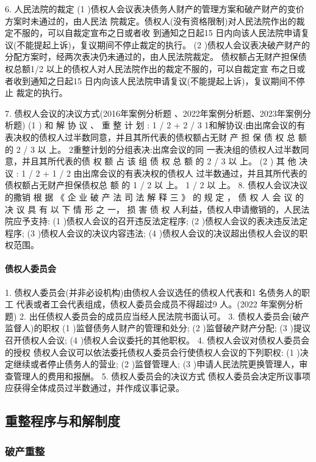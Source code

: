 \documentclass[UTF8,12pt]{ctexart}
\numberwithin{equation}{section} %
\numberwithin{figure}{section}
\numberwithin{table}{section}
\begin{document}
	
	6. 人民法院的裁定
	(1 )债权人会议表决债务人财产的管理方案和破产财产的变价方案时未通过的，由人民法 院裁定。债权人(没有资格限制)对人民法院作出的裁定不服的，可以自裁定宣布之日或者收 到通知之日起15 日内向该人民法院申请复议(不能提起上诉)，复议期间不停止裁定的执行。
	 (2 )债权人会议表决破产财产的分配方案时，经两次表决仍未通过的，由人民法院裁定。 债权额占无财产担保债权总额1/2 以上的债权人对人民法院作出的裁定不服的，可以自裁定宣 布之日或者收到通知之日起15 日内向该人民法院申请复议(不能提起上诉)，复议期间不停止 裁定的执行。
	
	7. 债权人会议的决议方式(2016年案例分析题 、2022年案例分析题、2023年案例分析题)
	 (1 ) 和 解 协 议 、 重 整 计 划 : 1 / 2 + 2 / 3 1和解协议:由出席会议的有表决权的债权人过半数同意，并且其所代表的债权额占无财 产 担 保 债 权 总 额 的 2 / 3 以 上。
	2重整计划的分组表决:出席会议的同 一表决组的债权人过半数同意，并且其所代表的债 权 额 占 该 组 债 权 总 额 的 2 / 3 以 上。
	(2 ) 其 他 决 议 : 1 / 2 + 1 / 2
	由出席会议的有表决权的债权人 过半数通过，并且其所代表的债权额占无财产担保债权总 额 的 1 / 2 以 上。
	 1 / 2 以 上。
	8. 债权人会议决议的撒销
	根 据 《 企 业 破 产 法 司 法 解 释 三 》 的 规 定 ， 债 权 人 会 议 的 决 议 具 有 以 下 情 形 之 一， 损 害 债 权 人利益，债权人申请撤销的，人民法院应予支持:
	(1 )债权人会议的召开违反法定程序;
	(2 )债权人会议的表决违反法定程序;
	(3 )债权人会议的决议内容违法;
	(4 )债权人会议的决议超出债权人会议的职权范围。
	
	\paragraph{债权人委员会}
	1. 债权人委员会(并非必设机构)由债权人会议选任的债权人代表和1 名债务人的职工 代表或者工会代表组成，债权人委员会成员不得超过9 人。(2022 年案例分析题)
	2. 出任债权人委员会的成员应当经人民法院书面认可。
	3. 债权人委员会(破产监督人)的职权
	(1 )监督债务人财产的管理和处分;
	(2 )监督破产财产分配;
	(3 )提议召开债权人会议;
	(4 )债权人会议委托的其他职权。
	4. 债权人会议对债权人委员会的授权 债权人会议可以依法委托债权人委员会行使债权人会议的下列职权:
	(1 )决定继续或者停止债务人的营业;
	(2 )监督管理人;
	(3 )申请人民法院更换管理人，审查管理人的费用和报酬。
	5. 债权人委员会的决议方式 债权人委员会决定所议事项应获得全体成员过半数通过，并作成议事记录。
	
	
	\subsection{重整程序与和解制度}
	\subsubsection{破产重整}
\end{document}
